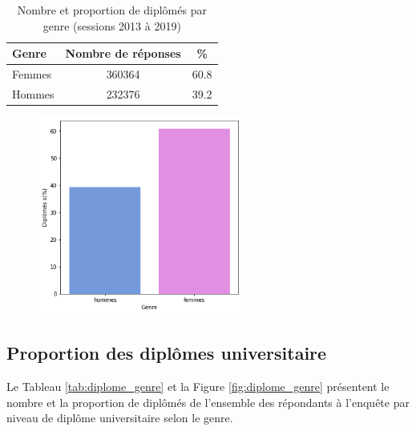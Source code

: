 \documentclass[12pt, a4paper, titlepage, table]{article}
\begin{document}
		\begin{table}[H]
			\centering
			\begin{tabular}{lcc}
				\toprule
				\textbf{Genre} & \textbf{Nombre de réponses} & \textbf{\%} \\
				\midrule
				Femmes & 360364 & 60.8 \\
				Hommes & 232376 & 39.2 \\
				\bottomrule
			\end{tabular}
			\caption{Nombre et proportion de diplômés par genre (sessions 2013 à 2019)}
			\label{tab:genre_responses}
		\end{table}
	
		\begin{figure}[H]
			\centering
			\includegraphics[width=0.6\textwidth]{../graphs/proportion_genre.png}
			\label{fig:genre_reponses}
		\end{figure}
	
	\subsection{Proportion des diplômes universitaire}
	Le Tableau \ref{tab:diplome_genre} et la Figure \ref{fig:diplome_genre} présentent le nombre et la proportion de diplômés de l'ensemble des répondants à l'enquête par niveau de diplôme universitaire selon le genre. 
	
\end{document}
